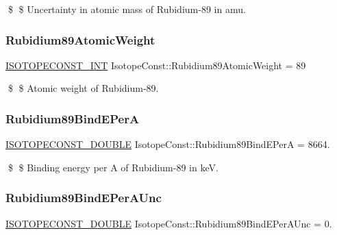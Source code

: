 \$ \$ Uncertainty in atomic mass of Rubidium-\/89 in amu. \mbox{\label{group___isotope_const-_rubidium-_rb89_ga5297d053eb0895f12f3f8f43e9750254}} 
\subsubsection{\texorpdfstring{Rubidium89\+Atomic\+Weight}{Rubidium89AtomicWeight}}
{\footnotesize\ttfamily \mbox{\hyperlink{group___isotope_const-_macros_ga5f18360b3e99483a35c32d789e62621c}{I\+S\+O\+T\+O\+P\+E\+C\+O\+N\+S\+T\+\_\+\+I\+NT}} Isotope\+Const\+::\+Rubidium89\+Atomic\+Weight = 89}

\$ \$ Atomic weight of Rubidium-\/89. \mbox{\label{group___isotope_const-_rubidium-_rb89_gade105eeb24bc4a5169a1c3a5ff9bd296}} 
\subsubsection{\texorpdfstring{Rubidium89\+Bind\+E\+PerA}{Rubidium89BindEPerA}}
{\footnotesize\ttfamily \mbox{\hyperlink{group___isotope_const-_macros_ga8f45a7272ce02c0b4c65c44636ed719a}{I\+S\+O\+T\+O\+P\+E\+C\+O\+N\+S\+T\+\_\+\+D\+O\+U\+B\+LE}} Isotope\+Const\+::\+Rubidium89\+Bind\+E\+PerA = 8664.}

\$ \$ Binding energy per A of Rubidium-\/89 in keV. \mbox{\label{group___isotope_const-_rubidium-_rb89_gad2289f609ef1776dd4ef3edeeb10a11a}} 
\subsubsection{\texorpdfstring{Rubidium89\+Bind\+E\+Per\+A\+Unc}{Rubidium89BindEPerAUnc}}
{\footnotesize\ttfamily \mbox{\hyperlink{group___isotope_const-_macros_ga8f45a7272ce02c0b4c65c44636ed719a}{I\+S\+O\+T\+O\+P\+E\+C\+O\+N\+S\+T\+\_\+\+D\+O\+U\+B\+LE}} Isotope\+Const\+::\+Rubidium89\+Bind\+E\+Per\+A\+Unc = 0.}

